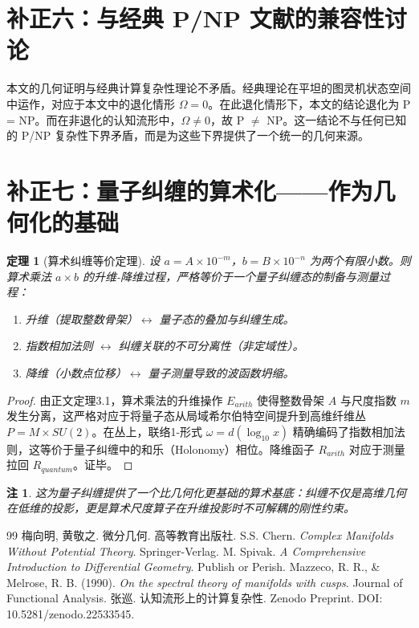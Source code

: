 \documentclass[11pt,a4paper]{article}
\newtheorem{theorem}{定理}
\newtheorem{remark}{注}
\begin{document}
\section*{补正六：与经典 P/NP 文献的兼容性讨论}
本文的几何证明与经典计算复杂性理论不矛盾。经典理论在平坦的图灵机状态空间中运作，对应于本文中的退化情形 \(\Omega = 0\)。在此退化情形下，本文的结论退化为 P = NP。而在非退化的认知流形中，\(\Omega \neq 0\)，故 P \(\neq\) NP。这一结论不与任何已知的 P/NP 复杂性下界矛盾，而是为这些下界提供了一个统一的几何来源。

\section*{补正七：量子纠缠的算术化——作为几何化的基础}
\begin{theorem}[算术纠缠等价定理]
设 \(a = A \times 10^{-m}\)，\(b = B \times 10^{-n}\) 为两个有限小数。则算术乘法 \(a \times b\) 的升维-降维过程，严格等价于一个量子纠缠态的制备与测量过程：
\begin{enumerate}
    \item 升维（提取整数骨架）\(\longleftrightarrow\) 量子态的叠加与纠缠生成。
    \item 指数相加法则 \(\longleftrightarrow\) 纠缠关联的不可分离性（非定域性）。
    \item 降维（小数点位移）\(\longleftrightarrow\) 量子测量导致的波函数坍缩。
\end{enumerate}
\end{theorem}
\begin{proof}
由正文定理3.1，算术乘法的升维操作 \(E_{arith}\) 使得整数骨架 \(A\) 与尺度指数 \(m\) 发生分离，这严格对应于将量子态从局域希尔伯特空间提升到高维纤维丛 \(P = M \times SU(2)\)。在丛上，联络1-形式 \(\omega = d(\log_{10} x)\) 精确编码了指数相加法则，这等价于量子纠缠中的和乐（Holonomy）相位。降维函子 \(R_{arith}\) 对应于测量拉回 \(R_{quantum}\)。证毕。
\end{proof}
\begin{remark}
这为量子纠缠提供了一个比几何化更基础的算术基底：纠缠不仅是高维几何在低维的投影，更是算术尺度算子在升维投影时不可解耦的刚性约束。
\end{remark}

\begin{thebibliography}{99}
 梅向明, 黄敬之. 微分几何. 高等教育出版社.
 S.S. Chern. \textit{Complex Manifolds Without Potential Theory}. Springer-Verlag.
 M. Spivak. \textit{A Comprehensive Introduction to Differential Geometry}. Publish or Perish.
 Mazzeco, R. R., \& Melrose, R. B. (1990). \textit{On the spectral theory of manifolds with cusps}. Journal of Functional Analysis.
 张巡. 认知流形上的计算复杂性. Zenodo Preprint. DOI: 10.5281/zenodo.22533545.
\end{thebibliography}
\end{document}
